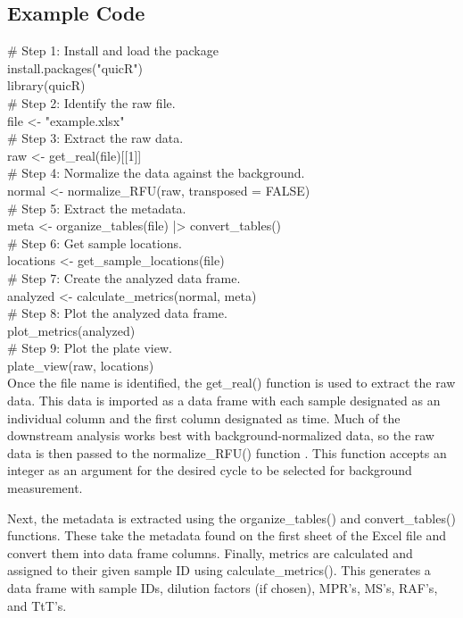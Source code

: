 \documentclass[preprint,12pt,a4paper]{elsarticle}
\begin{document}
        \subsection{Example Code}
            \# Step 1: Install and load the package\\
            install.packages("quicR")\\
            library(quicR)\\
            \# Step 2: Identify the raw file.\\
            file <- "example.xlsx"\\
            \# Step 3: Extract the raw data.\\
            raw <- get\_real(file)[[1]]\\
            \# Step 4: Normalize the data against the background.\\
            normal <- normalize\_RFU(raw, transposed = FALSE)\\
            \# Step 5: Extract the metadata.\\
            meta <- organize\_tables(file) |> convert\_tables()\\
            \# Step 6: Get sample locations.\\
            locations <- get\_sample\_locations(file)\\
            \# Step 7: Create the analyzed data frame.\\
            analyzed <- calculate\_metrics(normal, meta)\\
            \# Step 8: Plot the analyzed data frame.\\
            plot\_metrics(analyzed)\\
            \# Step 9: Plot the plate view.\\
            plate\_view(raw, locations)\\

            Once the file name is identified, the get\_real() function is used to extract the raw data. This data is imported as a data frame with each sample designated as an individual column and the first column designated as time. Much of the downstream analysis works best with background-normalized data, so the raw data is then passed to the normalize\_RFU() function \cite{Rowden2023}. This function accepts an integer as an argument for the desired cycle to be selected for background measurement. 
            
            Next, the metadata is extracted using the organize\_tables() and convert\_tables() functions. These take the metadata found on the first sheet of the Excel file and convert them into data frame columns. Finally, metrics are calculated and assigned to their given sample ID using calculate\_metrics(). This generates a data frame with sample IDs, dilution factors (if chosen), MPR's, MS's, RAF's, and TtT's.
\end{document}
